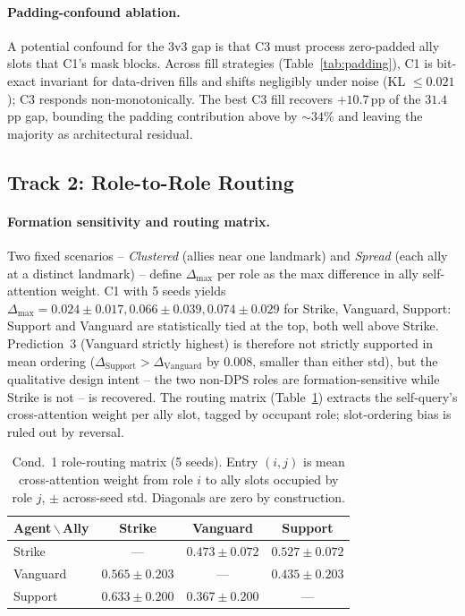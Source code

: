 \documentclass{nextgame2026}
\begin{document}
\paragraph{Padding-confound ablation.} A potential confound for the 3v3 gap is that C3 must process zero-padded ally slots that C1's mask blocks. Across fill strategies (Table~\ref{tab:padding}), C1 is bit-exact invariant for data-driven fills and shifts negligibly under noise (KL $\leq 0.021$); C3 responds non-monotonically. The best C3 fill recovers $+10.7$\,pp of the $31.4$\,pp gap, bounding the padding contribution above by $\sim 34\%$ and leaving the majority as architectural residual.

\subsection{Track 2: Role-to-Role Routing}

\paragraph{Formation sensitivity and routing matrix.} Two fixed scenarios -- \textit{Clustered} (allies near one landmark) and \textit{Spread} (each ally at a distinct landmark) -- define $\Delta_{\max}$ per role as the max difference in ally self-attention weight. C1 with 5 seeds yields $\Delta_{\max}=0.024{\pm}0.017, 0.066{\pm}0.039, 0.074{\pm}0.029$ for Strike, Vanguard, Support: Support and Vanguard are statistically tied at the top, both well above Strike. Prediction~3 (Vanguard strictly highest) is therefore not strictly supported in mean ordering ($\Delta_\text{Support} > \Delta_\text{Vanguard}$ by $0.008$, smaller than either std), but the qualitative design intent -- the two non-DPS roles are formation-sensitive while Strike is not -- is recovered. The routing matrix (Table~\ref{tab:routing}) extracts the self-query's cross-attention weight per ally slot, tagged by occupant role; slot-ordering bias is ruled out by reversal.

\begin{table}[t]
\centering
\small
\setlength{\tabcolsep}{7pt}
\caption{Cond.~1 role-routing matrix (5 seeds). Entry $(i,j)$ is mean cross-attention weight from role $i$ to ally slots occupied by role $j$, $\pm$ across-seed std. Diagonals are zero by construction.}
\label{tab:routing}
\begin{tabular}{lccc}
\toprule
Agent\,$\backslash$\,Ally & Strike & Vanguard & Support \\
\midrule
Strike   & --- & $0.473{\pm}0.072$ & $\mathbf{0.527{\pm}0.072}$ \\
Vanguard & $\mathbf{0.565{\pm}0.203}$ & --- & $0.435{\pm}0.203$ \\
Support  & $\mathbf{0.633{\pm}0.200}$ & $0.367{\pm}0.200$ & --- \\
\bottomrule
\end{tabular}
\end{table}
\end{document}
